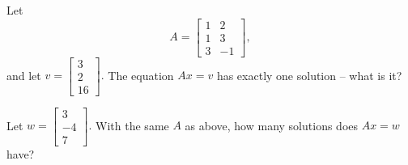 \endedxvertical








Let  \[A = \left[ \begin{array}{cc} 1 & 2  \\ 
1 & 3 \\
3 & -1 \end{array} \right] ,\]
and let $v = \left[\begin{array}{c} 3 \\ 2 \\ 16 
\end{array} \right].$  The equation $Ax = v$ has exactly one solution -- what is it?  




Let $w = \left[\begin{array}{c} 3 \\ -4 \\ 7 
\end{array} \right].$  With the same $A$ as above, how many solutions does $Ax = w$ have?


